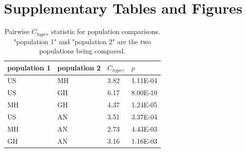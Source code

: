 \documentclass[9pt,twocolumn,twoside,lineno]{biorxiv}
\begin{document}
\section*{Supplementary Tables and Figures}


\begin{table}[h!]

\centering
\begin{tabular}{@{}llll@{}}
\toprule
population 1 & population 2 & $C_{hyper}$   & $p$  \\ \midrule
US   & MH   & 3.82 & 1.11E-04 \\
US   & GH   & 6.17 & 8.00E-10 \\
MH   & GH   & 4.37 & 1.24E-05 \\
US   & AN   & 3.51 & 3.37E-04 \\
MH   & AN   & 2.73 & 4.43E-03 \\
GH   & AN   & 3.16 & 1.16E-03 \\ \bottomrule
\end{tabular}
\label{tab:C_hyper}
\caption{Pairwise $C_{hyper}$ statistic for population comparisons. "population 1" and "population 2" are the two populations being compared.}
\end{table}

\clearpage
\end{document}
